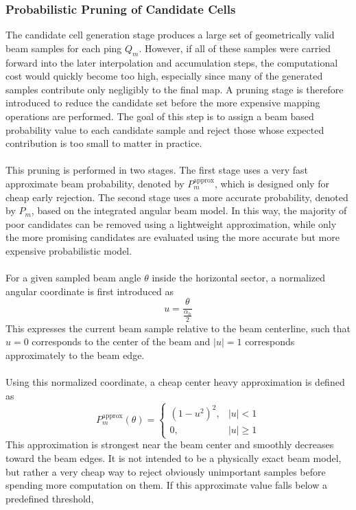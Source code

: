 \subsubsection{Probabilistic Pruning of Candidate Cells}
The candidate cell generation stage produces a large set of geometrically valid beam samples for each ping $Q_m$. However, if all of these samples were carried forward into the later interpolation and accumulation steps, the computational cost would quickly become too high, especially since many of the generated samples contribute only negligibly to the final map. A pruning stage is therefore introduced to reduce the candidate set before the more expensive mapping operations are performed. The goal of this step is to assign a beam based probability value to each candidate sample and reject those whose expected contribution is too small to matter in practice.
\\ \\
This pruning is performed in two stages. The first stage uses a very fast approximate beam probability, denoted by $P_m^{\mathrm{approx}}$, which is designed only for cheap early rejection. The second stage uses a more accurate probability, denoted by $P_m$, based on the integrated angular beam model. In this way, the majority of poor candidates can be removed using a lightweight approximation, while only the more promising candidates are evaluated using the more accurate but more expensive probabilistic model.
\\ \\
For a given sampled beam angle $\theta$ inside the horizontal sector, a normalized angular coordinate is first introduced as
$$
    u = \frac{\theta}{ \frac{\alpha_h}{2}}
$$
This expresses the current beam sample relative to the beam centerline, such that $u=0$ corresponds to the center of the beam and $|u|=1$ corresponds approximately to the beam edge. 
\\ \\
Using this normalized coordinate, a cheap center heavy approximation is defined as
\begin{equation}
    P_m^{\mathrm{approx}}(\theta) =
    \begin{cases}
        \left(1-u^2\right)^2, & |u| < 1 \\[0.25em]
        0, & |u| \geq 1
    \end{cases}
    \label{eq:local-map-generation-pm-approx}
\end{equation}
This approximation is strongest near the beam center and smoothly decreases toward the beam edges. It is not intended to be a physically exact beam model, but rather a very cheap way to reject obviously unimportant samples before spending more computation on them. If this approximate value falls below a predefined threshold,
